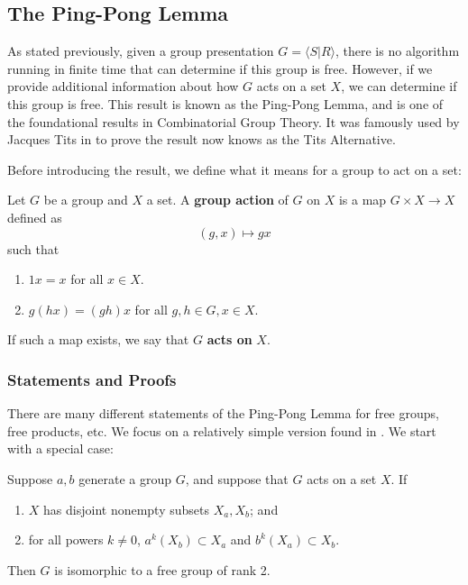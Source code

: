 \subsection{The Ping-Pong Lemma}

As stated previously, given a group presentation $G = \langle S | R \rangle$, there is no algorithm running in finite time that can determine if this group is free. However, if we provide additional information about how $G$ acts on a set $X$, we can determine if this group is free. This result is known as the Ping-Pong Lemma, and is one of the foundational results in Combinatorial Group Theory. It was famously used by Jacques Tits in \cite{Tits1972} to prove the result now knows as the Tits Alternative.

Before introducing the result, we define what it means for a group to act on a set:

\begin{defn}
    Let $G$ be a group and $X$ a set. A \textbf{group action} of $G$ on $X$ is a map $G \times X \to X$ defined as 
    \[ (g,x) \mapsto gx \]
    such that
    \begin{enumerate}
        \item $1x = x$ for all $x \in X$.
        \item $g(hx) = (gh)x$ for all $g,h \in G, x \in X$. 
    \end{enumerate}
    If such a map exists, we say that $G$ \textbf{acts on} $X$. 
\end{defn}

\subsubsection{Statements and Proofs}

There are many different statements of the Ping-Pong Lemma for free groups, free products, etc. We focus on a relatively simple version found in \cite{ClayMargalit2017}. We start with a special case:

\begin{thm}\label{Ping Pong for 2 Players}
    Suppose $a,b$ generate a group $G$, and suppose that $G$ acts on a set $X$. If 
    \begin{enumerate}
        \item $X$ has disjoint nonempty subsets $X_a, X_b$; and 
        \item for all powers $k \neq 0$, $a^k(X_b) \subset X_a$ and $b^k(X_a) \subset X_b$.
    \end{enumerate}
    Then $G$ is isomorphic to a free group of rank 2.
\end{thm}

